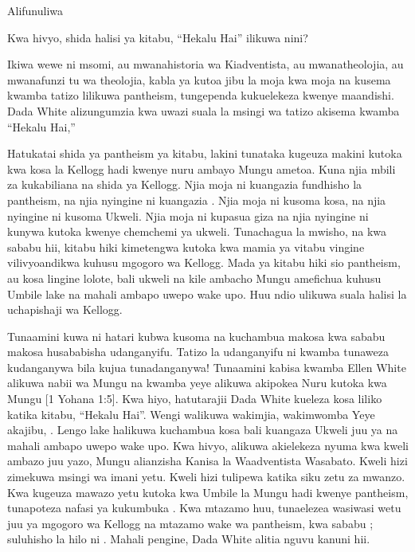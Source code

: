 Alifunuliwa 


Kwa hivyo, shida halisi ya kitabu, “Hekalu Hai” ilikuwa nini?


Ikiwa wewe ni msomi, au mwanahistoria wa Kiadventista, au mwanatheolojia, au mwanafunzi tu wa theolojia, kabla ya kutoa jibu la moja kwa moja na kusema kwamba tatizo lilikuwa pantheism, tungependa kukuelekeza kwenye maandishi. Dada White alizungumzia kwa uwazi suala la msingi wa tatizo akisema kwamba “Hekalu Hai,” 


Hatukatai shida ya pantheism ya kitabu, lakini tunataka kugeuza makini kutoka kwa kosa la Kellogg hadi kwenye nuru ambayo Mungu ametoa. Kuna njia mbili za kukabiliana na shida ya Kellogg. Njia moja ni kuangazia fundhisho la pantheism, na njia nyingine ni kuangazia . Njia moja ni kusoma kosa, na njia nyingine ni kusoma Ukweli. Njia moja ni kupasua giza na njia nyingine ni kunywa kutoka kwenye chemchemi ya ukweli. Tunachagua la mwisho, na kwa sababu hii, kitabu hiki kimetengwa kutoka kwa mamia ya vitabu vingine vilivyoandikwa kuhusu mgogoro wa Kellogg. Mada ya kitabu hiki sio pantheism, au kosa lingine lolote, bali ukweli na kile ambacho Mungu amefichua kuhusu Umbile lake na mahali ambapo uwepo wake upo. Huu ndio ulikuwa suala halisi la uchapishaji wa Kellogg.


Tunaamini kuwa ni hatari kubwa kusoma na kuchambua makosa kwa sababu makosa husababisha udanganyifu. Tatizo la udanganyifu ni kwamba tunaweza kudanganywa bila kujua tunadanganywa! Tunaamini kabisa kwamba Ellen White alikuwa nabii wa Mungu na kwamba yeye alikuwa akipokea Nuru kutoka kwa Mungu [1 Yohana 1:5]. Kwa hiyo, hatutarajii Dada White kueleza kosa liliko katika kitabu, “Hekalu Hai”. Wengi walikuwa wakimjia, wakimwomba  Yeye akajibu, . Lengo lake halikuwa kuchambua kosa bali kuangaza Ukweli juu ya  na mahali ambapo uwepo wake upo. Kwa hivyo, alikuwa akielekeza nyuma kwa kweli ambazo juu yazo, Mungu alianzisha Kanisa la Waadventista Wasabato. Kweli hizi zimekuwa msingi wa imani yetu. Kweli hizi tulipewa katika siku zetu za mwanzo. Kwa kugeuza mawazo yetu kutoka kwa Umbile la Mungu hadi kwenye pantheism, tunapoteza nafasi ya kukumbuka . Kwa mtazamo huu, tunaelezea wasiwasi wetu juu ya mgogoro wa Kellogg na mtazamo wake wa pantheism, kwa sababu ; suluhisho la hilo ni . Mahali pengine, Dada White alitia nguvu kanuni hii.


